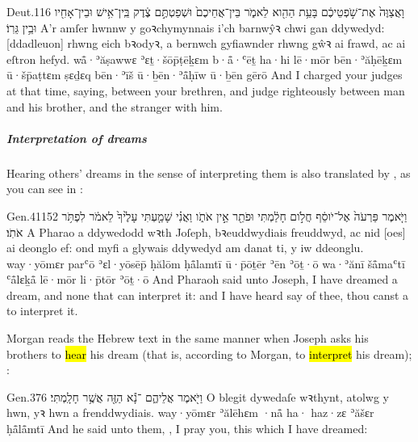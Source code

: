 \begin{example}{Deut.}{1}{16}{}{}
	\quoling
	{וָאֲצַוֶּה֙ אֶת־שֹׁ֣פְטֵיכֶ֔ם בָּעֵ֥ת הַהִ֖וא לֵאמֹ֑ר  בֵּין־אֲחֵיכֶם֙ וּשְׁפַטְתֶּ֣ם צֶ֔דֶק בֵּֽין־אִ֥ישׁ וּבֵין־אָחִ֖יו וּבֵ֥ין גֵּרֽוֹ׃}
	{A’r amſer hwnnw y goꝛchymynnais i’ch barnwŷꝛ chwi gan ddywedyd:  [ddadleuon] rhwng eich bꝛodyꝛ, a bernwch gyfiawnder rhwng gŵꝛ ai frawd, ac ai eſtron hefyd.}
	{wå̄·ʾăṣawwɛ ʾɛṯ·šōp̄ṭēḵɛm b·å̄·ʿēṯ ha·hi lē·mōr  bēn·ʾăḥēḵɛm ū·šp̄aṭtɛm ṣɛḏɛq bēn·ʾīš ū·ḇēn·ʾå̄ḥīw ū·ḇēn gērō}
	{And I charged your judges at that time, saying,   between your brethren, and judge righteously between  man and his brother, and the stranger  with him.}
\end{example}



\subparagraph{Interpretation of dreams}

\begin{paper}
	{\click} Hearing others’ dreams in the sense of interpreting them is also translated by , as you can see in :
\end{paper}

\begin{example}{Gen.}{41}{15}{2}{}
	\quoling
	{וַיֹּ֤אמֶר פַּרְעֹה֙ אֶל־יֹוסֵ֔ף חֲלֹ֣ום חָלַ֔מְתִּי וּפֹתֵ֖ר אֵ֣ין אֹתֹ֑ו וַאֲנִ֗י שָׁמַ֤עְתִּי עָלֶ֙יךָ֙ לֵאמֹ֔ר   לִפְתֹּ֥ר אֹתֹֽו׃}
	{A Pharao a ddywedodd wꝛth Joſeph, bꝛeuddwydiais freuddwyd, ac nid [oes] ai deonglo ef: ond myfi a glywais ddywedyd am danat ti, y   iw ddeonglu.}
	{way·yōmɛr parʿō ʾɛl·yōsēp̄ ḥălōm ḥå̄lamtī ū·p̄ōṯēr ʾēn ʾōṯ·ō wa·ʾănī šå̄maʿtī ʿå̄lɛḵå̄ lē·mōr   li·p̄tōr ʾōṯ·ō}
	{And Pharaoh said unto Joseph, I have dreamed a dream, and  none that can interpret it: and I have heard say of thee,  thou canst  a  to interpret it.}
\end{example}

\begin{paper}
	{\click} Morgan reads the Hebrew text in the same manner when Joseph asks his brothers to \hl{hear} his dream (that is, according to Morgan, to \hl{interpret} his dream); :
\end{paper}

\begin{example}{Gen.}{37}{6}{}{}
	\quoling
	{וַיֹּ֖אמֶר אֲלֵיהֶ֑ם ־נָ֕א  הַזֶּ֖ה אֲשֶׁ֥ר חָלָֽמְתִּי׃}
	{O blegit dywedaſe wꝛthynt,  atolwg y  hwn, yꝛ hwn a frenddwydiais.}
	{way·yōmɛr ʾălēhɛm ·nå̄ ha· haz·zɛ ʾăšɛr ḥå̄lå̄mtī}
	{And he said unto them, , I pray you, this  which I have dreamed:}
\end{example}

